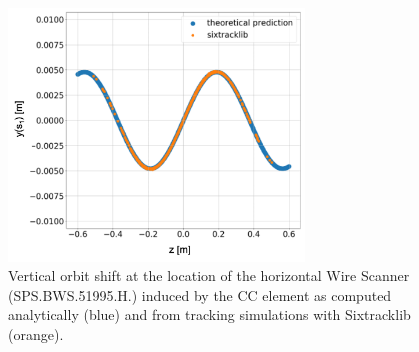 

\begin{figure}[!h]
    \centering         
    \includegraphics[width=0.7\textwidth]{images/Ch6/Vcc_orbit_shfit_sixtracklib_sanity_check.png}
        \caption{Vertical orbit shift at the location of the horizontal Wire Scanner (SPS.BWS.51995.H.) induced by the CC element as computed analytically (blue) and from tracking simulations with Sixtracklib (orange).}
        \label{fig:sixtracklib_CC_orbit_shift_vs_theory}
\end{figure}

